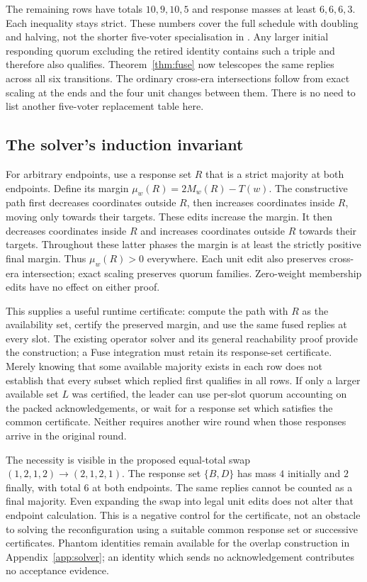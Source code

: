 The remaining rows have totals $10,9,10,5$ and response masses at least
$6,6,6,3$. Each inequality stays strict. These numbers cover the full schedule
with doubling and halving, not the shorter five-voter specialisation in
. Any larger initial responding quorum excluding
the retired identity contains such a triple and therefore also qualifies.
Theorem~\ref{thm:fuse} now telescopes the same replies across all six
transitions. The ordinary cross-era intersections follow from exact scaling
at the ends and the four unit changes between them. There is no need to list
another five-voter replacement table here.

\subsection{The solver's induction invariant}
For arbitrary endpoints, use a response set $R$ that is a strict majority at
both endpoints. Define its margin $\mu_w(R)=2M_w(R)-T(w)$. The constructive
path first decreases coordinates outside $R$, then increases coordinates
inside $R$, moving only towards their targets. These edits increase the
margin. It then decreases coordinates inside $R$ and increases coordinates
outside $R$ towards their targets. Throughout these latter phases the margin
is at least the strictly positive final margin. Thus $\mu_w(R)>0$ everywhere.
Each unit edit also preserves cross-era intersection; exact scaling preserves
quorum families. Zero-weight membership edits have no effect on either proof.

This supplies a useful runtime certificate: compute the path with $R$ as the
availability set, certify the preserved margin, and use the same fused replies
at every slot. The existing operator solver and its general reachability proof
provide the construction; a Fuse integration must retain its response-set
certificate. Merely knowing that some available majority exists in each row
does not establish that every subset which replied first qualifies in all rows.
If only a larger available set $L$ was certified, the leader can use per-slot
quorum accounting on the packed acknowledgements, or wait for a response set
which satisfies the common certificate. Neither requires another wire round
when those responses arrive in the original round.

The necessity is visible in the proposed equal-total swap
$(1,2,1,2)\to(2,1,2,1)$. The response set $\{B,D\}$ has mass $4$ initially
and $2$ finally, with total $6$ at both endpoints. The same replies cannot be
counted as a final majority. Even expanding the swap into legal unit edits
does not alter that endpoint calculation. This is a negative control for the
certificate, not an obstacle to solving the reconfiguration using a suitable
common response set or successive certificates. Phantom identities remain
available for the overlap construction in Appendix~\ref{app:solver}; an
identity which sends no acknowledgement contributes no acceptance evidence.

